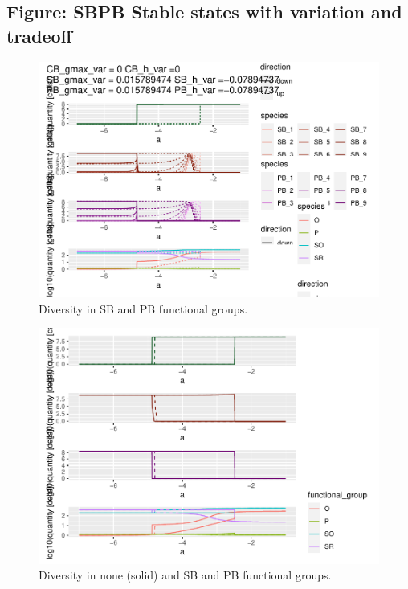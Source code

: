 \documentclass{article}
\begin{document}
\hypertarget{figure-sbpb-stable-states-with-variation-and-tradeoff}{%
\subsection{Figure: SBPB Stable states with variation and
tradeoff}\label{figure-sbpb-stable-states-with-variation-and-tradeoff}}

\begin{figure}

{\centering \includegraphics[width=1\linewidth]{article_files/figure-latex/SBPB_var1-1} 

}

\caption{Diversity in SB and PB functional groups.}\label{fig:SBPB_var1}
\end{figure}

\begin{figure}

{\centering \includegraphics[width=1\linewidth]{article_files/figure-latex/SBPB_var2-1} 

}

\caption{Diversity in none (solid) and SB and PB functional groups.}\label{fig:SBPB_var2}
\end{figure}
\end{document}
